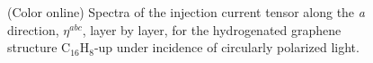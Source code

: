 \documentclass[pss]{wiley2sp} %
\begin{document}
\begin{figure}[b]
  \centering
  \\
  \\
  \caption{(Color online) Spectra of the injection current tensor along the \emph{a} direction, {$\eta^{abc}$}, layer by layer, for the hydrogenated graphene structure C$_{16}$H$_{8}$-up under incidence of circularly polarized light.\label{fig:up-eta}}
\end{figure}
\end{document}
